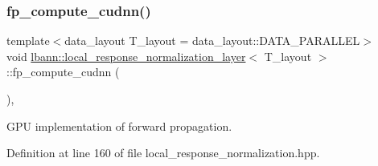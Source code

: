 \subsubsection{\texorpdfstring{fp\+\_\+compute\+\_\+cudnn()}{fp\_compute\_cudnn()}}
{\footnotesize\ttfamily template$<$data\+\_\+layout T\+\_\+layout = data\+\_\+layout\+::\+D\+A\+T\+A\+\_\+\+P\+A\+R\+A\+L\+L\+EL$>$ \\
void \hyperlink{classlbann_1_1local__response__normalization__layer}{lbann\+::local\+\_\+response\+\_\+normalization\+\_\+layer}$<$ T\+\_\+layout $>$\+::fp\+\_\+compute\+\_\+cudnn (\begin{DoxyParamCaption}{ }\end{DoxyParamCaption})\hspace{0.3cm}{\ttfamily [inline]}, {\ttfamily [private]}}



G\+PU implementation of forward propagation. 



Definition at line 160 of file local\+\_\+response\+\_\+normalization.\+hpp.


